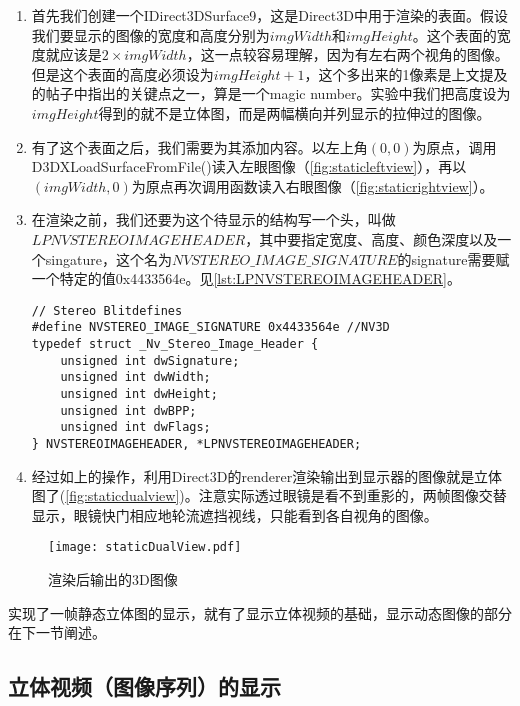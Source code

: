 \begin{enumerate}
\item 首先我们创建一个IDirect3DSurface9，这是Direct3D中用于渲染的表面。假设我们要显示的图像的宽度和高度分别为$imgWidth$和$imgHeight$。这个表面的宽度就应该是$2\times imgWidth$，这一点较容易理解，因为有左右两个视角的图像。但是这个表面的高度必须设为$imgHeight+1$，这个多出来的1像素是上文提及的帖子中指出的关键点之一，算是一个magic number。实验中我们把高度设为$imgHeight$得到的就不是立体图，而是两幅横向并列显示的拉伸过的图像。
\item 有了这个表面之后，我们需要为其添加内容。以左上角$(0,0)$为原点，调用D3DXLoadSurfaceFromFile()读入左眼图像（\autoref{fig:staticleftview}），再以$(imgWidth,0)$为原点再次调用函数读入右眼图像（\autoref{fig:staticrightview}）。
\item 在渲染之前，我们还要为这个待显示的结构写一个头，叫做$LPNVSTEREOIMAGEHEADER$，其中要指定宽度、高度、颜色深度以及一个singature，这个名为$NVSTEREO\_IMAGE\_SIGNATURE$的signature需要赋一个特定的值0x4433564e。见\autoref{lst:LPNVSTEREOIMAGEHEADER}。
\begin{lstlisting}[caption = {LPNVSTEREOIMAGEHEADER的结构}, label = lst:LPNVSTEREOIMAGEHEADER]
// Stereo Blitdefines
#define NVSTEREO_IMAGE_SIGNATURE 0x4433564e //NV3D
typedef struct _Nv_Stereo_Image_Header {
    unsigned int dwSignature;
    unsigned int dwWidth;
    unsigned int dwHeight;
    unsigned int dwBPP;
    unsigned int dwFlags;
} NVSTEREOIMAGEHEADER, *LPNVSTEREOIMAGEHEADER;
\end{lstlisting}
\item 经过如上的操作，利用Direct3D的renderer渲染输出到显示器的图像就是立体图了(\autoref{fig:staticdualview})。注意实际透过眼镜是看不到重影的，两帧图像交替显示，眼镜快门相应地轮流遮挡视线，只能看到各自视角的图像。
\end{enumerate}


\begin{figure}[htbp]
\begin{center}
\texttt{[image: staticDualView.pdf]}
\caption{渲染后输出的3D图像}
\label{fig:staticdualview}
\end{center}
\end{figure}

实现了一帧静态立体图的显示，就有了显示立体视频的基础，显示动态图像的部分在下一节阐述。

\subsection{立体视频（图像序列）的显示}
\label{subsec:motion3dimgdisp}

